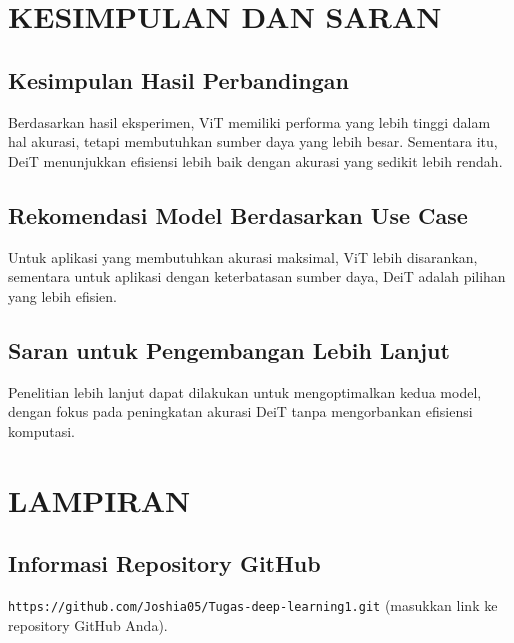 \documentclass[11pt,a4paper]{article}
\begin{document}
\section{KESIMPULAN DAN SARAN}

\subsection{Kesimpulan Hasil Perbandingan}
Berdasarkan hasil eksperimen, ViT memiliki performa yang lebih tinggi dalam hal akurasi, tetapi membutuhkan sumber daya yang lebih besar. Sementara itu, DeiT menunjukkan efisiensi lebih baik dengan akurasi yang sedikit lebih rendah.

\subsection{Rekomendasi Model Berdasarkan Use Case}
Untuk aplikasi yang membutuhkan akurasi maksimal, ViT lebih disarankan, sementara untuk aplikasi dengan keterbatasan sumber daya, DeiT adalah pilihan yang lebih efisien.

\subsection{Saran untuk Pengembangan Lebih Lanjut}
Penelitian lebih lanjut dapat dilakukan untuk mengoptimalkan kedua model, dengan fokus pada peningkatan akurasi DeiT tanpa mengorbankan efisiensi komputasi.

\newpage
\section{LAMPIRAN}

\subsection{Informasi Repository GitHub}
\texttt{https://github.com/Joshia05/Tugas-deep-learning1.git} (masukkan link ke repository GitHub Anda).
\end{document}
